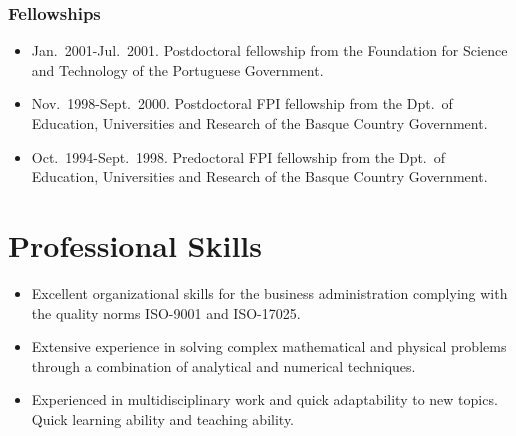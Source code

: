 \documentclass{article}
\begin{document}

\subsubsection*{Fellowships}

\begin{itemize}\itemsep 0pt
\item Jan.~2001-Jul.~2001.
Postdoctoral fellowship from the Foundation for Science and
Technology of the Portuguese Government.

\item Nov.~1998-Sept.~2000.
Postdoctoral FPI fellowship from the Dpt.\ of Education,
Universities and Research of the Basque Country Government.

\item Oct.~1994-Sept.~1998.
Predoctoral FPI fellowship from the Dpt.\ of Education,
Universities and Research of the Basque Country Government.
\end{itemize}



\section*{Professional Skills}

\begin{itemize}\itemsep 0pt
\item Excellent organizational skills for the business administration complying with the quality norms ISO-9001 and ISO-17025.

\item Extensive experience in solving complex mathematical and physical 
problems through a combination of analytical and numerical techniques.

\item Experienced in multidisciplinary work and quick adaptability 
to new topics. Quick learning ability and teaching ability.
\end{itemize}

\end{document}
